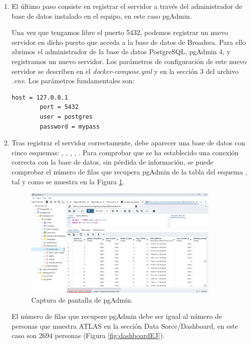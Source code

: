 \begin{enumerate}
    \item El último paso consiste en registrar el servidor a través del administrador de base de datos instalado en el equipo, en este caso pgAdmin. 
    
    Una vez que tengamos libre el puerto 5432, podemos registrar un nuevo servidor en dicho puerto que acceda a la base de datos de Broadsea. Para ello abrimos el administrador de la base de datos PostgreSQL, pgAdmin 4, y registramos un nuevo servidor. Los parámetros de configuración de este nuevo servidor se describen en el \textit{docker-compose.yml} y en la sección 3 del archivo \textit{.env}. Los parámetros fundamentales son:

    \begin{lstlisting}[language=sh]
        host = 127.0.0.1
        port = 5432
        user = postgres
        password = mypass\end{lstlisting}
    
    \item Tras registrar el servidor correctamente, debe aparecer una base de datos con cinco esquemas: , , , , . Para comprobar que se ha establecido una conexión correcta con la base de datos, sin pérdida de información, se puede comprobar el número de filas que recupera pgAdmin de la tabla  del esquema , tal y como se muestra en la Figura \ref{fig:pgAdmin}.

    \begin{figure}[H]
    \centering
    \includegraphics[width=0.90\textwidth]{figures/pgAdmin.png}
     \caption{Captura de pantalla de pgAdmin.}
    \label{fig:pgAdmin}
    \end{figure}

    El número de filas que recupere pgAdmin debe ser igual al número de personas que muestra ATLAS en la sección Data Sorce/Dashboard, en este caso son 2694 personas (Figura \ref{fig:dashboardEJ}).


\end{enumerate}
